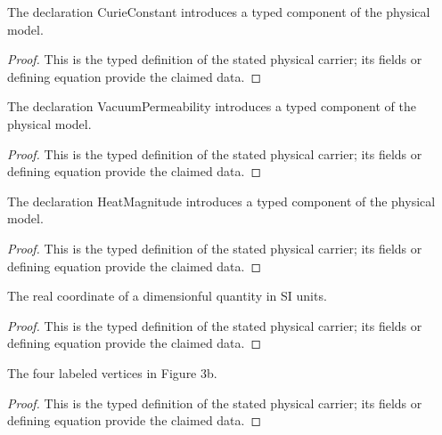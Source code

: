 \begin{definition}
  \label{def:physics:IPhO_2026_3_C_2:aux011}
  The declaration CurieConstant introduces a typed component of the physical model.
\end{definition}
\begin{proof}
  This is the typed definition of the stated physical carrier; its fields or defining equation provide the claimed data.
\end{proof}

\begin{definition}
  \label{def:physics:IPhO_2026_3_C_2:aux012}
  The declaration VacuumPermeability introduces a typed component of the physical model.
\end{definition}
\begin{proof}
  This is the typed definition of the stated physical carrier; its fields or defining equation provide the claimed data.
\end{proof}

\begin{definition}
  \label{def:physics:IPhO_2026_3_C_2:aux013}
  The declaration HeatMagnitude introduces a typed component of the physical model.
\end{definition}
\begin{proof}
  This is the typed definition of the stated physical carrier; its fields or defining equation provide the claimed data.
\end{proof}

\begin{definition}
  \label{def:physics:IPhO_2026_3_C_2:aux014}
  The real coordinate of a dimensionful quantity in SI units.
\end{definition}
\begin{proof}
  This is the typed definition of the stated physical carrier; its fields or defining equation provide the claimed data.
\end{proof}

\begin{definition}
  \label{def:physics:IPhO_2026_3_C_2:aux015}
  The four labeled vertices in Figure 3b.
\end{definition}
\begin{proof}
  This is the typed definition of the stated physical carrier; its fields or defining equation provide the claimed data.
\end{proof}

